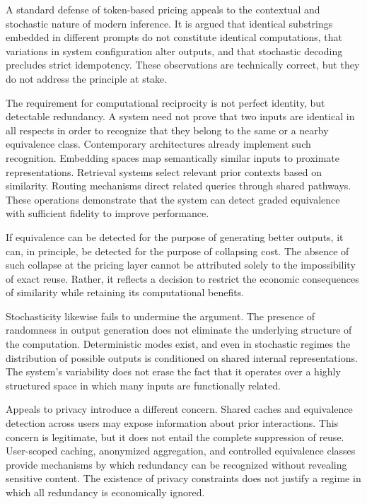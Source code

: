 \documentclass[12pt, oneside]{article}
\begin{document}
A standard defense of token-based pricing appeals to the contextual and stochastic nature of modern inference. It is argued that identical substrings embedded in different prompts do not constitute identical computations, that variations in system configuration alter outputs, and that stochastic decoding precludes strict idempotency. These observations are technically correct, but they do not address the principle at stake.

The requirement for computational reciprocity is not perfect identity, but detectable redundancy. A system need not prove that two inputs are identical in all respects in order to recognize that they belong to the same or a nearby equivalence class. Contemporary architectures already implement such recognition. Embedding spaces map semantically similar inputs to proximate representations. Retrieval systems select relevant prior contexts based on similarity. Routing mechanisms direct related queries through shared pathways. These operations demonstrate that the system can detect graded equivalence with sufficient fidelity to improve performance.

If equivalence can be detected for the purpose of generating better outputs, it can, in principle, be detected for the purpose of collapsing cost. The absence of such collapse at the pricing layer cannot be attributed solely to the impossibility of exact reuse. Rather, it reflects a decision to restrict the economic consequences of similarity while retaining its computational benefits.

Stochasticity likewise fails to undermine the argument. The presence of randomness in output generation does not eliminate the underlying structure of the computation. Deterministic modes exist, and even in stochastic regimes the distribution of possible outputs is conditioned on shared internal representations. The system's variability does not erase the fact that it operates over a highly structured space in which many inputs are functionally related.

Appeals to privacy introduce a different concern. Shared caches and equivalence detection across users may expose information about prior interactions. This concern is legitimate, but it does not entail the complete suppression of reuse. User-scoped caching, anonymized aggregation, and controlled equivalence classes provide mechanisms by which redundancy can be recognized without revealing sensitive content. The existence of privacy constraints does not justify a regime in which all redundancy is economically ignored.
\end{document}
